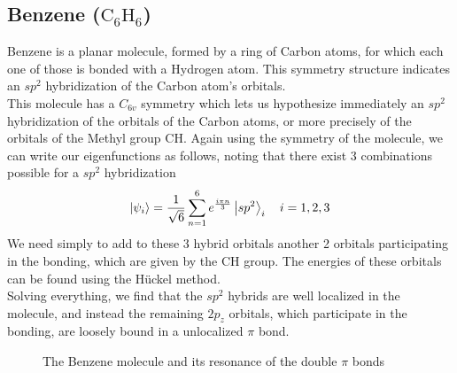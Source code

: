 \documentclass[../qm.tex]{subfiles}
\begin{document}
	\subsection{Benzene ($\mathrm{C_6H_6}$)}
	Benzene is a planar molecule, formed by a ring of Carbon atoms, for which each one of those is bonded with a Hydrogen atom. This symmetry structure indicates an $sp^2$ hybridization of the Carbon atom's orbitals.\\
	This molecule has a $C_{6v}$ symmetry which lets us hypothesize immediately an $sp^2$ hybridization of the orbitals of the Carbon atoms, or more precisely of the orbitals of the Methyl group $\mathrm{CH}$. Again using the symmetry of the molecule, we can write our eigenfunctions as follows, noting that there exist 3 combinations possible for a $sp^2$ hybridization
	\begin{equation}
		\ket{\psi_i}=\frac{1}{\sqrt{6}}\sum_{n=1}^6e^{\frac{i\pi n}{3}}\ket{sp^2}_i\quad i=1,2,3
		\label{eq:benzeneeigenfunctions}
	\end{equation}
	We need simply to add to these 3 hybrid orbitals another 2 orbitals participating in the bonding, which are given by the $\mathrm{CH}$ group. The energies of these orbitals can be found using the Hückel method.\\
	Solving everything, we find that the $sp^2$ hybrids are well localized in the molecule, and instead the remaining $2p_z$ orbitals, which participate in the bonding, are loosely bound in a unlocalized $\pi$ bond.
	\begin{figure}[H]
		\centering
		\qquad\qquad{}
		\label{fig:benzene}
		\caption{The Benzene molecule and its resonance of the double $\pi$ bonds}
	\end{figure}
\end{document}
